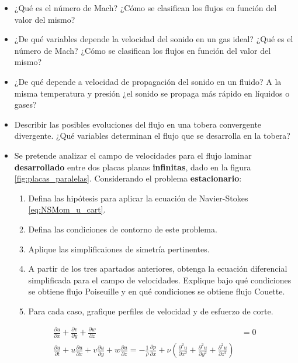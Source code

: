 \begin{itemize}
\item ¿Qué es el número de Mach? ¿Cómo se clasifican los flujos en función del valor del mismo?
 \item ¿De qué variables depende la velocidad del sonido en un gas ideal? ¿Qué es el número de Mach? ¿Cómo se clasifican los flujos en función del valor del mismo?
\item ¿De qué depende a velocidad de propagación del sonido en un fluido?
A la misma temperatura y presión ¿el sonido se propaga más rápido en líquidos o gases?
\item Describir las posibles evoluciones del flujo en una tobera convergente divergente. ¿Qué variables determinan el flujo que se desarrolla en la tobera?
\item Se pretende analizar el campo de velocidades para el flujo laminar \textbf{desarrollado} entre dos placas planas \textbf{infinitas}, dado en la figura \ref{fig:placas_paralelas}. Considerando el problema \textbf{estacionario}:
\begin{enumerate}
  \item Defina las hipótesis para aplicar la ecuación de Navier-Stokes \ref{eq:NSMom_u_cart}.
  \item Defina las condiciones de contorno de este problema.
  \item Aplique las simplificaiones de simetría pertinentes.
  \item A partir de los tres apartados anteriores, obtenga la ecuación diferencial simplificada para el campo de velocidades. Explique bajo qué condiciones se obtiene flujo Poiseuille y en qué condiciones se obtiene flujo Couette.
  \item Para cada caso, grafique perfiles de velocidad y de esfuerzo de corte.
\end{enumerate}
\begin{equation}\label{eq:NSMom_u_cart}
\begin{aligned}
\frac{\partial u}{\partial x} + \frac{\partial v}{\partial y} + \frac{\partial w}{\partial z}&= 0
\\
\frac{\partial u}{\partial t} + u\frac{\partial u}{\partial x} + v\frac{\partial u}{\partial y} + w \frac{\partial u}{\partial z} = -\frac{1}{\rho}\frac{\partial p}{\partial x} + \nu \left(\frac{\partial^2 u}{\partial x^2} + \frac{\partial^2 u}{\partial y^2} + \frac{\partial^2 u}{\partial z^2}\right)
\end{aligned}
\end{equation}


\end{itemize}
